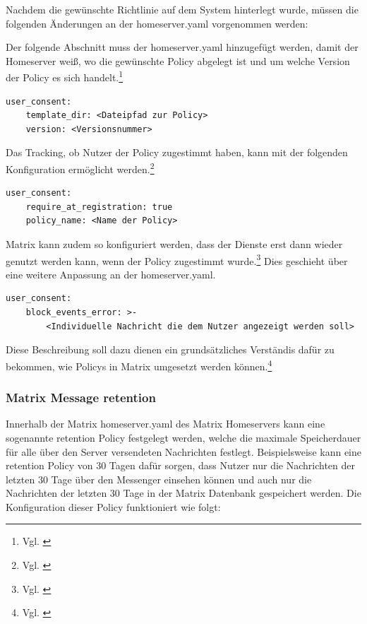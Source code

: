 Nachdem die gewünschte Richtlinie auf dem System hinterlegt wurde, müssen die folgenden Änderungen an der homeserver.yaml vorgenommen werden:

Der folgende Abschnitt muss der homeserver.yaml hinzugefügt werden, damit der Homeserver weiß, wo die gewünschte Policy abgelegt ist und um welche Version der Policy es sich handelt.\footnote{Vgl. \cite{Matrix.org-custom-policies2020}}

\begin{lstlisting}
user_consent:
    template_dir: <Dateipfad zur Policy>
    version: <Versionsnummer>
\end{lstlisting}

Das Tracking, ob Nutzer der Policy zugestimmt haben, kann mit der folgenden Konfiguration ermöglicht werden.\footnote{Vgl. \cite{Matrix.org-custom-policies2020}}

\begin{lstlisting}
user_consent:
    require_at_registration: true
    policy_name: <Name der Policy>
\end{lstlisting}

Matrix kann zudem so konfiguriert werden, dass der Dienste erst dann wieder genutzt werden kann, wenn der Policy zugestimmt wurde.\footnote{Vgl. \cite{Matrix.org-custom-policies2020}}
Dies geschieht über eine weitere Anpassung an der homeserver.yaml.

\begin{lstlisting}
user_consent:
    block_events_error: >-
        <Individuelle Nachricht die dem Nutzer angezeigt werden soll>
\end{lstlisting}

Diese Beschreibung soll dazu dienen ein grundsätzliches Verständis dafür zu bekommen, wie Policys in Matrix umgesetzt werden können.\footnote{Vgl. \cite{Matrix.org-custom-policies2020}}

\subsubsection{Matrix Message retention}\label{chapter:vdmf}
Innerhalb der Matrix homeserver.yaml des Matrix Homeservers kann eine sogenannte retention Policy festgelegt werden, welche die maximale Speicherdauer für alle über den Server versendeten Nachrichten festlegt. Beispielsweise kann eine retention Policy von 30 Tagen dafür sorgen, dass Nutzer nur die Nachrichten der letzten 30 Tage über den Messenger einsehen können und auch nur die Nachrichten der letzten 30 Tage in der Matrix Datenbank gespeichert werden. Die Konfiguration dieser Policy funktioniert wie folgt:


